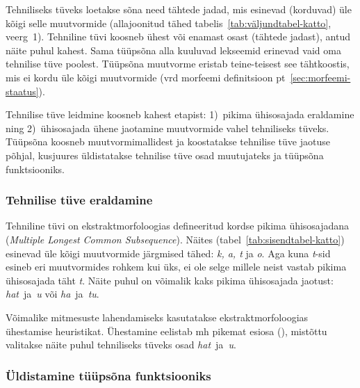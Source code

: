 \documentclass[12pt,a4paper]{article}
\newcommand{\vadja}[1]{\textit{#1}}
\begin{document}
Tehniliseks tüveks loetakse sõna need tähtede jadad, mis esinevad (korduvad) üle kõigi selle muutvormide (allajoonitud tähed tabelis~\ref{tab:väljundtabel-katto}, veerg~1). Tehniline tüvi koosneb ühest või enamast osast (tähtede jadast), antud näite puhul kahest. Sama tüüpsõna alla kuuluvad lekseemid erinevad vaid oma tehnilise tüve poolest. %
Tüüpsõna muutvorme eristab teine-teisest see tähtkoostis, mis ei kordu üle kõigi muutvormide (vrd morfeemi definitsioon pt~\ref{sec:morfeemi-staatus}).

Tehnilise tüve leidmine koosneb kahest etapist: 1)~pikima ühisosajada eraldamine ning 2)~ühisosajada ühene jaotamine muutvormide vahel tehniliseks tüveks. Tüüpsõna koosneb muutvormimallidest ja koostatakse tehnilise tüve jaotuse põhjal, kusjuures üldistatakse tehnilise tüve osad muutujateks ja tüüpsõna funktsiooniks.


\subsubsection{Tehnilise tüve eraldamine}

Tehniline tüvi on ekstraktmorfoloogias defineeritud kordse pikima ühisosajadana (\textit{Multiple Longest Common Subsequence}). %
Näites (tabel~\ref{tab:sisendtabel-katto}) esinevad üle kõigi muutvormide järgmised tähed: \vadja{k, a, t} ja \vadja{o}. Aga kuna \textit{t}-sid esineb eri muutvormides rohkem kui üks, ei ole selge millele neist vastab pikima ühisosajada täht \textit{t}.  Näite puhul on võimalik kaks pikima ühisosajada jaotust: \textit{hat}~ja~\textit{u} või \textit{ha}~ja~\textit{tu}.

Võimalike mitmesuste lahendamiseks kasutatakse ekstraktmorfoloogias ühestamise heuristikat. %
Ühestamine eelistab mh pikemat esiosa (\cite[33]{hulden_generalizing_2014}), mistõttu valitakse näite puhul tehniliseks tüveks osad \textit{hat}~ja~\textit{u}.


\subsubsection{Üldistamine tüüpsõna funktsiooniks}
\end{document}
